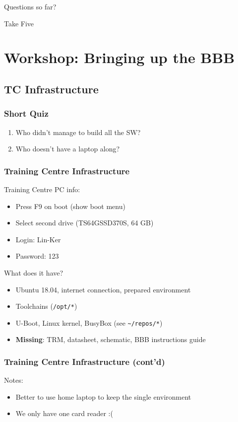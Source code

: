 \begin{frame}[standout]
  Questions so far?
\end{frame}

\begin{frame}[standout]
  Take Five
\end{frame}

\section{Workshop: Bringing up the BBB}

\subsection{TC Infrastructure}

\begin{frame}
  \frametitle{Short Quiz}
  \begin{enumerate}
    \item Who didn't manage to build all the SW?
    \item Who doesn't have a laptop along?
  \end{enumerate}
\end{frame}

\begin{frame}
  \frametitle{Training Centre Infrastructure}

  Training Centre PC info:
  \begin{itemize}
    \item Press F9 on boot (show boot menu)
    \item Select second drive (TS64GSSD370S, 64 GB)
    \item Login: Lin-Ker
    \item Password: 123
  \end{itemize}

  What does it have?
  \begin{itemize}
    \item Ubuntu 18.04, internet connection, prepared environment
    \item Toolchains (\texttt{/opt/*})
    \item U-Boot, Linux kernel, BusyBox (see \texttt{\textasciitilde/repos/*})
    \item \textbf{Missing}: TRM, datasheet, schematic, BBB instructions guide
  \end{itemize}
\end{frame}

\begin{frame}
  \frametitle{Training Centre Infrastructure (cont'd)}
  Notes:
  \begin{itemize}
    \item Better to use home laptop to keep the single environment
    \item We only have one card reader :(
  \end{itemize}
\end{frame}

